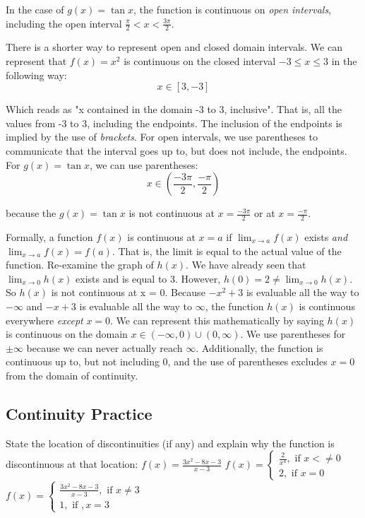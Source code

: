 In the case of $g(x) = \tan{x}$, the function is continuous on \textit{open 
intervals}, including the open interval $\frac{\pi}{2} < x < \frac{3\pi}{2}$.

There is a shorter way to represent open and closed domain intervals. We can 
represent that $f(x) = x^2$ is continuous on the closed interval $-3 \leq x \leq 3$ 
in the following way: $$x \in \left[3, -3 \right]$$

Which reads as "x contained in the domain -3 to 3, inclusive". That is, all the 
values from -3 to 3, including the endpoints. The inclusion of the endpoints is 
implied by the use of \textit{brackets}. For open intervals, we use parentheses to 
communicate that the interval goes up to, but does not include, the endpoints. For 
$g(x) = \tan{x}$, we can use parentheses: 
$$x \in \left(\frac{-3\pi}{2}, \frac{-\pi}{2}\right)$$

because the $g(x) = \tan{x}$ is not continuous at $x=\frac{-3\pi}{2}$ or at 
$x=\frac{-\pi}{2}$.



Formally, a function $f(x)$ is continuous at $x=a$ if $\lim_{x\to a}f(x)$ exists 
\textit{and} $\lim_{x\to a}f(x) = f(a)$. That is, the limit is equal to the actual 
value of the function. Re-examine the graph of $h(x)$. We have already seen that $
\lim_{x\to 0}h(x)$ exists and is equal to 3. However, $h(0) = 2 \neq \lim_{x\to0}
h(x)$. So $h(x)$ is not continuous at x = 0. Because $-x^2+3$ is evaluable all the 
way to $-\infty$ and $-x+3$ is evaluable all the way to $\infty$, the function 
$h(x)$ is continuous everywhere \textit{except} $x=0$. We can represent this 
mathematically by saying $h(x)$ is continuous on the domain $x \in \left(-\infty, 
0\right)\cup \left(0, \infty\right)$. We use parentheses for $\pm\infty$ because we 
can never actually reach $\infty$. Additionally, the function is continuous up to, 
but not including $0$, and the use of parentheses excludes $x=0$ from the domain of 
continuity.

\subsection{Continuity Practice}
\begin{Exercise}[title=Limits Practice 5, label=limits5]
State the location of discontinuities (if any) and explain why the function is 
discontinuous at that location:
    \Question $f(x) = \frac{3x^2-8x-3}{x-3}$
    \Question $f(x) = \begin{cases}
    \frac{2}{x^4}, \text{ if } x <\neq 0\\
    2, \text{ if } x=0
    \end{cases}$
    \Question $f(x) = \begin{cases}
        \frac{3x^2-8x-3}{x-3}, \text{ if } x \neq 3\\
        1, \text{ if }, x=3
    \end{cases}$
\end{Exercise}

